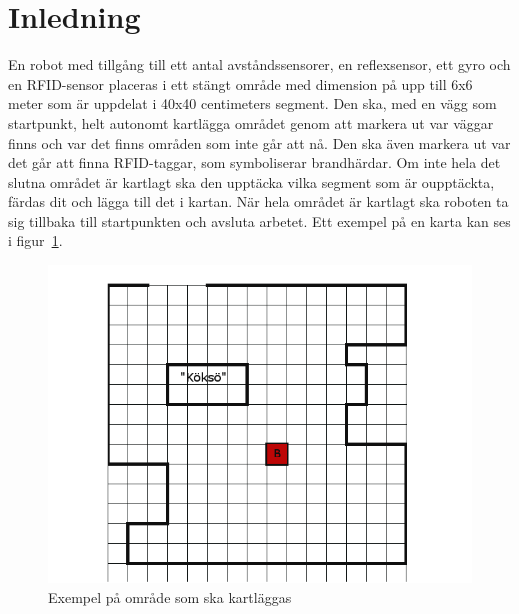 \documentclass[a4paper,12pt,fleqn]{article}
\begin{document}
\addto\captionsswedish{\renewcommand{\contentsname}{Innehållsförteckning}}

\tableofcontents
\thispagestyle{fancy}
\newpage


\section{Inledning}

En robot med tillgång till ett antal avståndssensorer, en reflexsensor, ett gyro och en RFID-sensor placeras i ett stängt område med dimension på upp till 6x6 meter som är uppdelat i 40x40 centimeters segment. 
Den ska, med en vägg som startpunkt, helt autonomt kartlägga området genom att markera ut var väggar finns och var det finns områden som inte går att nå. 
Den ska även markera ut var det går att finna RFID-taggar, som symboliserar brandhärdar. 
Om inte hela det slutna området är kartlagt ska den upptäcka vilka segment som är oupptäckta, färdas dit och lägga till det i kartan. 
När hela området är kartlagt ska roboten ta sig tillbaka till startpunkten och avsluta arbetet. Ett exempel på en karta kan ses i figur~\ref{fig:omrade}.
\begin{figure}[htp] %
  \begin{center}
  \includegraphics[keepaspectratio=true,scale=0.5]{gimpmap.png}  %
  \end{center}
  \caption{Exempel på område som ska kartläggas} %
  \label{fig:omrade}
\end{figure}
\end{document}
